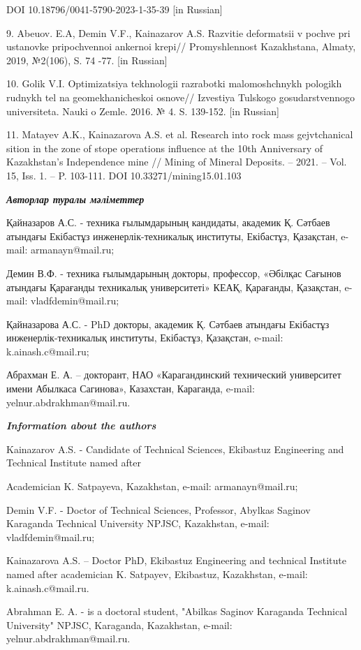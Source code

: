 \begin{noparindent}
DOI 10.18796/0041-5790-2023-1-35-39 {[}in Russian{]}

9. Abeuov. E.A, Demin V.F., Kainazarov A.S. Razvitie deformatsii v
pochve pri ustanovke pripochvennoi ankernoi krepi//
Promyshlennost\textquotesingle{} Kazakhstana, Almaty, 2019, №2(106), S.
74 -77. {[}in Russian{]}

10. Golik V.I. Optimizatsiya tekhnologii razrabotki malomoshchnykh
pologikh rudnykh tel na geomekhanicheskoi osnove// Izvestiya
Tul\textquotesingle skogo gosudarstvennogo universiteta. Nauki o Zemle.
2016. № 4. S. 139-152. {[}in Russian{]}

11. Matayev A.K., Kainazarova A.S. et al. Research into rock mass
gejvtchanical sition in the zone of stope operations influence at the
10th Anniversary of Kazakhstan's Independence mine // Mining of Mineral
Deposits. -- 2021. -- Vol. 15, Iss. 1. -- P. 103-111. DOI
10.33271/mining15.01.103
\end{noparindent}

\emph{{\bfseries Авторлар туралы мәліметтер}}

\begin{noparindent}
Қайназаров А.С. - техника ғылымдарының кандидаты, академик Қ. Сәтбаев
атындағы Екібастұз инженерлік-техникалық институты, Екібастұз,
Қазақстан, e-mail: armanayn@mail.ru;

Демин В.Ф. - техника ғылымдарының докторы, профессор, «Әбілқас Сағынов
атындағы Қарағанды техникалық университеті» КЕАҚ, Қарағанды, Қазақстан,
e-mail: vladfdemin@mail.ru;

Қайназарова А.С. - PhD докторы, академик Қ. Сәтбаев атындағы Екібастұз
инженерлік-техникалық институты, Екібастұз, Қазақстан, e-mail:
k.ainash.c@mail.ru;

Абрахман Е. А. -- докторант, НАО «Карагандинский технический университет
имени Абылкаса Сагинова», Казахстан, Караганда, e-mail:
yelnur.abdrakhman@mail.ru.
\end{noparindent}

\emph{{\bfseries Information about the authors}}

\begin{noparindent}
Kainazarov A.S. - Candidate of Technical Sciences, Ekibastuz Engineering
and Technical Institute named after

Academician K. Satpayeva, Kazakhstan, e-mail: armanayn@mail.ru;

Demin V.F. - Doctor of Technical Sciences, Professor, Abylkas Saginov
Karaganda Technical University NPJSC, Kazakhstan, e-mail:
vladfdemin@mail.ru;

Kainazarova A.S. -- Doctor PhD, Ekibastuz Engineering and technical
Institute named after academician K. Satpayev, Ekibastuz, Kazakhstan,
e-mail: k.ainash.c@mail.ru.

Abrahman E. A. - is a doctoral student, "Abilkas Saginov Karaganda
Technical University" NPJSC, Karaganda, Kazakhstan, e-mail:
yelnur.abdrakhman@mail.ru.
\end{noparindent}
